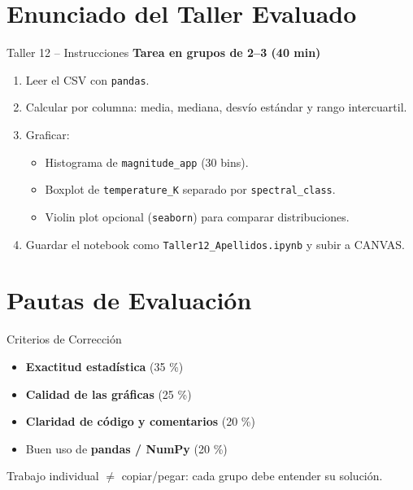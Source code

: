 \documentclass[10pt]{beamer}
\begin{document}
\section{Enunciado del Taller Evaluado}
\begin{frame}{Taller 12 – Instrucciones}
  \textbf{Tarea en grupos de 2–3 (40 min)}  
  \begin{enumerate}
    \item Leer el CSV con \texttt{pandas}.
    \item Calcular por columna: media, mediana, desvío estándar y rango intercuartil.
    \item Graficar:
      \begin{itemize}
        \item Histograma de \texttt{magnitude\_app} (30 bins).
        \item Boxplot de \texttt{temperature\_K} separado por \texttt{spectral\_class}.
        \item Violin plot opcional (\texttt{seaborn}) para comparar distribuciones.
      \end{itemize}
    \item Guardar el notebook como \texttt{Taller12\_Apellidos.ipynb} y subir a CANVAS.
  \end{enumerate}
\end{frame}

\section{Pautas de Evaluación}
\begin{frame}{Criterios de Corrección}
  \begin{itemize}
    \item \textbf{Exactitud estadística} (35 \%)
    \item \textbf{Calidad de las gráficas} (25 \%)
    \item \textbf{Claridad de código y comentarios} (20 \%)
    \item Buen uso de \textbf{pandas / NumPy} (20 \%)
  \end{itemize}
  \vspace{0.2cm}
  Trabajo individual \(\neq\) copiar/pegar: cada grupo debe entender su solución.
\end{frame}
\end{document}
